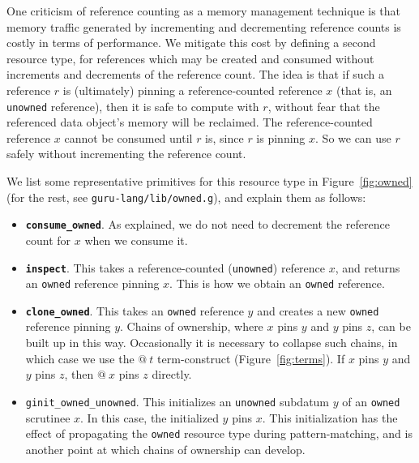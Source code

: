 \documentclass[9pt,natbib]{sigplanconf}
\begin{document}
One criticism of reference counting as a memory management technique
is that memory traffic generated by incrementing and decrementing
reference counts is costly in terms of performance.  We mitigate this
cost by defining a second resource type, for references which may be
created and consumed without increments and decrements of the
reference count.  The idea is that if such a reference $r$ is
(ultimately) pinning a reference-counted reference $x$ (that is, an
\texttt{unowned} reference), then it is safe to compute with $r$,
without fear that the referenced data object's memory will be
reclaimed.  The reference-counted reference $x$ cannot be consumed
until $r$ is, since $r$ is pinning $x$.  So we can use $r$ safely
without incrementing the reference count.

We list some representative primitives for this resource type in
Figure~\ref{fig:owned} (for the rest, see
\texttt{guru-lang/lib/owned.g}), and explain them as follows:

\begin{itemize}
\item \textbf{\texttt{consume\_owned}}.  As explained, we do not need to 
decrement the reference count for $x$ when we consume it.

\item \textbf{\texttt{inspect}}. This takes a reference-counted
  (\texttt{unowned}) reference $x$, and returns an \texttt{owned}
  reference pinning $x$.  This is how we obtain an \texttt{owned}
  reference.

\item \textbf{\texttt{clone\_owned}}. This takes an \texttt{owned}
  reference $y$ and creates a new \texttt{owned} reference pinning
  $y$.  Chains of ownership, where $x$ pins $y$ and $y$ pins $z$, can
  be built up in this way.  Occasionally it is necessary to collapse
  such chains, in which case we use the $@\ t$ term-construct
  (Figure~\ref{fig:terms}).  If $x$ pins $y$ and $y$ pins $z$, then
  $@\ x$ pins $z$ directly.

\item \texttt{ginit\_owned\_unowned}. This initializes an
  \texttt{unowned} subdatum $y$ of an \texttt{owned} scrutinee $x$.
  In this case, the initialized $y$ pins $x$.  This initialization has
  the effect of propagating the \texttt{owned} resource type during
  pattern-matching, and is another point at which chains of ownership
  can develop.

\end{itemize}
\end{document}
